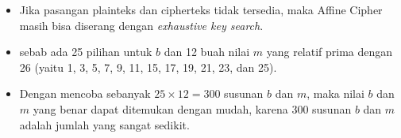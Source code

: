 \documentclass{article}
\begin{document}

\begin{itemize}
    \item Jika pasangan plainteks dan cipherteks tidak tersedia, maka Affine Cipher masih bisa diserang dengan \textit{exhaustive key search}.
    \item sebab ada 25 pilihan untuk $b$ dan 12 buah nilai $m$ yang relatif prima dengan 26 (yaitu 1, 3, 5, 7, 9, 11, 15, 17, 19, 21, 23, dan 25).
    \item Dengan mencoba sebanyak $25 \times 12 = 300$ susunan $b$ dan $m$, maka nilai $b$ dan $m$ yang benar dapat ditemukan dengan mudah, karena 300 susunan $b$ dan $m$ adalah jumlah yang sangat sedikit.
\end{itemize}
\end{document}
